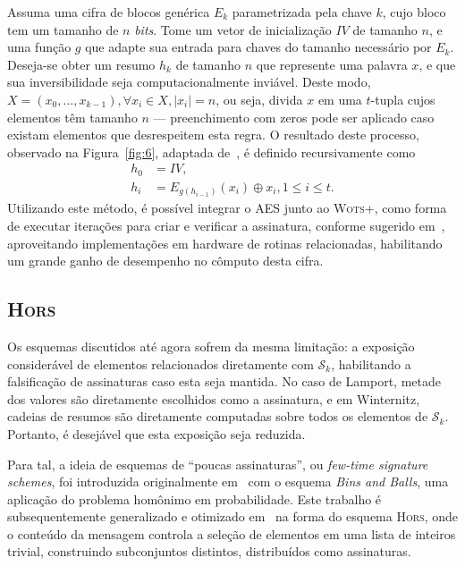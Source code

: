 \documentclass{ufsctex/ufsctex}
\newcommand{\sk}{\mathcal{S}_{k}}
\newcommand{\length}[1]{\vert{} #1 \vert{}}
\newcommand{\wotsplus}{\textsc{Wots+}}
\newcommand{\hors}{\textsc{Hors}}
\begin{document}
Assuma uma cifra de blocos genérica $E_{k}$ parametrizada pela chave $k$, cujo
bloco tem um tamanho de $n$ \emph{bits}. Tome um vetor de inicialização $IV$ de
tamanho $n$, e uma função $g$ que adapte sua entrada para chaves do tamanho
necessário por $E_{k}$. Deseja-se obter um resumo $h_{k}$ de tamanho $n$ que
represente uma palavra $x$, e que sua inversibilidade seja computacionalmente
inviável. Deste modo, $X = (x_{0}, \dots, x_{k - 1}), \forall x_{i} \in X,
\length{x_{i}} = n$, ou seja, divida $x$ em uma $t$-tupla cujos elementos têm
tamanho $n$ --- preenchimento com zeros pode ser aplicado caso existam
elementos que desrespeitem esta regra. O resultado deste processo, observado na
Figura~\ref{fig:6}, adaptada de~\cite{Jean:misc:2016:apr}, é definido
recursivamente como
\begin{equation}
  \begin{split}
    h_{0} &= IV, \\
    h_{i} &= E_{g(h_{i - 1})}(x_{i}) \oplus x_{i}, 1 \leq i \leq t.
  \end{split}
\end{equation}
Utilizando este método, é possível integrar o AES junto ao \wotsplus{}, como
forma de executar iterações para criar e verificar a assinatura, conforme
sugerido em~\cite[Subseção 4.1]{Huelsing:inproc:2013:jun}, aproveitando
implementações em hardware de rotinas relacionadas, habilitando um grande ganho
de desempenho no cômputo desta cifra.

\subsection{\hors{}}\label{subsection:hors}

Os esquemas discutidos até agora sofrem da mesma limitação: a exposição
considerável de elementos relacionados diretamente com $\sk{}$, habilitando a
falsificação de assinaturas caso esta seja mantida. No caso de Lamport, metade
dos valores são diretamente escolhidos como a assinatura, e em Winternitz,
cadeias de resumos são diretamente computadas sobre todos os elementos de
$\sk{}$. Portanto, é desejável que esta exposição seja reduzida.

Para tal, a ideia de esquemas de ``poucas assinaturas'', ou \emph{few-time
signature schemes}, foi introduzida originalmente
em~\cite{Perrig:inproc:2001:nov} com o esquema \emph{Bins and Balls}, uma
aplicação do problema homônimo em probabilidade. Este trabalho é
subsequentemente generalizado e otimizado em~\cite{Reyzin:inproc:2002:jul} na
forma do esquema \hors{}\sigla{\hors{}}{\emph{Hash to Obtain Random Subset}},
onde o conteúdo da mensagem controla a seleção de elementos em uma lista de
inteiros trivial, construindo subconjuntos distintos, distribuídos como
assinaturas.
\end{document}
